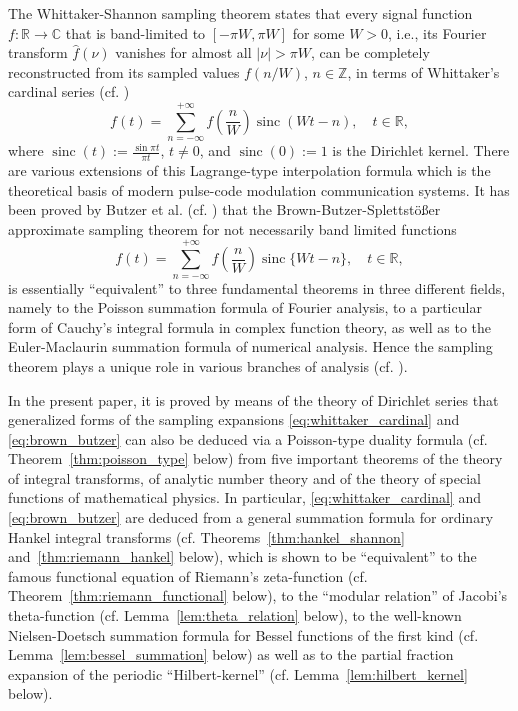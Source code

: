 \documentclass[11pt]{article}
\theoremstyle{plain}
\begin{document}
The Whittaker-Shannon sampling theorem states that every signal function $f: \mathbb{R} \to \mathbb{C}$ that is band-limited to $[-\pi W, \pi W]$ for some $W > 0$, i.e., its Fourier transform $\hat{f}(\nu)$ vanishes for almost all $|\nu| > \pi W$, can be completely reconstructed from its sampled values $f(n/W)$, $n \in \mathbb{Z}$, in terms of Whittaker's cardinal series (cf. \cite{28,32})
\begin{equation}
f(t) = \sum_{n=-\infty}^{+\infty} f\left(\frac{n}{W}\right) \operatorname{sinc}\left(Wt - n\right), \quad t \in \mathbb{R},
\label{eq:whittaker_cardinal}
\end{equation}
where $\operatorname{sinc}(t) := \frac{\sin \pi t}{\pi t}$, $t \neq 0$, and $\operatorname{sinc}(0) := 1$ is the Dirichlet kernel. There are various extensions of this Lagrange-type interpolation formula which is the theoretical basis of modern pulse-code modulation communication systems. It has been proved by Butzer et al. (cf. \cite{7,8,9,10}) that the Brown-Butzer-Splettstößer approximate sampling theorem for not necessarily band limited functions
\begin{equation}
f(t) = \sum_{n=-\infty}^{+\infty} f\left(\frac{n}{W}\right) \operatorname{sinc}\{Wt - n\}, \quad t \in \mathbb{R},
\label{eq:brown_butzer}
\end{equation}
is essentially ``equivalent'' to three fundamental theorems in three different fields, namely to the Poisson summation formula of Fourier analysis, to a particular form of Cauchy's integral formula in complex function theory, as well as to the Euler-Maclaurin summation formula of numerical analysis. Hence the sampling theorem plays a unique role in various branches of analysis (cf. \cite{5}).

In the present paper, it is proved by means of the theory of Dirichlet series that generalized forms of the sampling expansions \eqref{eq:whittaker_cardinal} and \eqref{eq:brown_butzer} can also be deduced via a Poisson-type duality formula (cf. Theorem~\ref{thm:poisson_type} below) from five important theorems of the theory of integral transforms, of analytic number theory and of the theory of special functions of mathematical physics. In particular, \eqref{eq:whittaker_cardinal} and \eqref{eq:brown_butzer} are deduced from a general summation formula for ordinary Hankel integral transforms (cf. Theorems~\ref{thm:hankel_shannon} and~\ref{thm:riemann_hankel} below), which is shown to be ``equivalent'' to the famous functional equation of Riemann's zeta-function (cf. Theorem~\ref{thm:riemann_functional} below), to the ``modular relation'' of Jacobi's theta-function (cf. Lemma~\ref{lem:theta_relation} below), to the well-known Nielsen-Doetsch summation formula for Bessel functions of the first kind (cf. Lemma~\ref{lem:bessel_summation} below) as well as to the partial fraction expansion of the periodic ``Hilbert-kernel'' (cf. Lemma~\ref{lem:hilbert_kernel} below).
\end{document}
